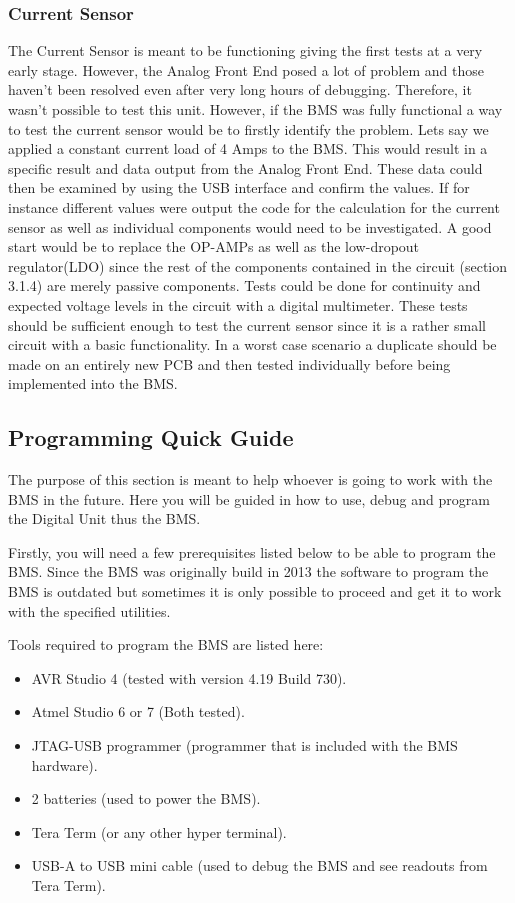 \subsubsection{Current Sensor}
The Current Sensor is meant to be functioning giving the first tests at a very early stage. However, the Analog Front End posed a lot of problem and those haven't been resolved even after very long hours of debugging. Therefore, it wasn't possible to test this unit. However, if the BMS was fully functional a way to test the current sensor would be to firstly identify the problem. Lets say we applied a constant current load of 4 Amps to the BMS. This would result in a specific result and data output from the Analog Front End. These data could then be examined by using the USB interface and confirm the values. If for instance different values were output the code for the calculation for the current sensor as well as individual components would need to be investigated. A good start would be to replace the OP-AMPs as well as the low-dropout regulator(LDO) since the rest of the components contained in the circuit\cite{BMSDocumentation} (section 3.1.4) are merely passive components. Tests could be done for continuity and expected voltage levels in the circuit with a digital multimeter. These tests should be sufficient enough to test the current sensor since it is a rather small circuit with a basic functionality. In a worst case scenario a duplicate should be made on an entirely new PCB and then tested individually before being implemented into the BMS.

\subsection{Programming Quick Guide}
\label{sec:BMSDebugging}
The purpose of this section is meant to help whoever is going to work with the BMS in the future. Here you will be guided in how to use, debug and program the Digital Unit thus the BMS.

Firstly, you will need a few prerequisites listed below to be able to program the BMS. Since the BMS was originally build in 2013 the software to program the BMS is outdated but sometimes it is only possible to proceed and get it to work with the specified utilities. 

Tools required to program the BMS are listed here:
	\begin{itemize}
		\item AVR Studio 4 (tested with version 4.19 Build 730).
		\item Atmel Studio 6 or 7 (Both tested).
		\item JTAG-USB programmer (programmer that is included with the BMS hardware).
		\item 2 batteries (used to power the BMS).
		\item Tera Term (or any other hyper terminal).
		\item USB-A to USB mini cable (used to debug the BMS and see readouts from Tera Term).
	\end{itemize}
	
